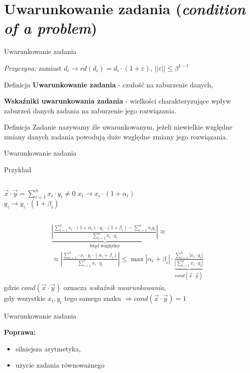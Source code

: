 \section{Uwarunkowanie zadania ({\it condition of a problem})}
\begin{frame}{Uwarunkowanie zadania}

	{\it Przyczyna:} zamiast 
    	$d_i \rightarrow rd(d_i) = d_i \cdot (1 + \varepsilon)$,
        $||\varepsilon|| \le \beta^{1-t}$
        
    \begin{block}{Definicja}
    	{\bf Uwarunkowanie zadania} - czułość na zaburzenie danych,
        
        {\bf Wskaźniki uwarunkowania zadania} - wielkości charakteryzujące wpływ zaburzeń danych zadania na zaburzenie jego rozwiązania.
    \end{block}
    
    \begin{block}{Definicja}
    Zadanie nazywamy źle uwarunkowanym, jeżeli niewielkie względne zmiany danych zadania powodują duże względne zmiany jego rozwiązania.
    \end{block}
\end{frame}
\begin{frame}{Uwarunkowanie zadania}
	\begin{exampleblock}{Przykład}
    \begin{columns}
        	\centering
            $\vec{x} \cdot \vec{y} = \sum_{i=1}^n x_i \cdot y_i \neq 0$
                $x_i \rightarrow x_i \cdot (1 + \alpha_i)$ \\
                $y_i \rightarrow y_i \cdot (1 + \beta_i)$
    \end{columns}
    \begin{gather*}
    	\underbrace{\left| \frac{
        	\sum_{i=1}^n x_i \cdot (1 + \alpha_i) \cdot y_i \cdot (1 + \beta_i) - \sum_{i=1}^n x_i y_i
        }{
        	\sum_{i=1}^n x_i \cdot y_i
        }\right|}_\text{błąd względny}
        \approx \\ \approx
        \left| \frac{
        	\sum_{i=1}^n \cdot x_i \cdot y_i \cdot \left( \alpha_i + \beta_i \right)
        }{
        	\sum_{i=1}^n x_i \cdot y_i
        }\right|
        \le
        \max \left| \alpha_i + \beta_i \right| \cdot \underbrace{\frac{
        	\sum_{i=1}^n \left| x_i \cdot y_i \right|
        }{
        	\left| \sum_{i=1}^n x_i \cdot y_i \right|
        }}_{cond(\vec{x} \cdot \vec{y})}
    \end{gather*}
    gdzie $cond(\vec{x} \cdot \vec{y})$ oznacza {\it wskaźnik uwarunkowania}, \\ 
    gdy wszystkie $x_i, y_i$ tego samego znaku $\Rightarrow cond(\vec{x} \cdot \vec{y}) = 1$
    \end{exampleblock}
\end{frame}
\begin{frame}{Uwarunkowanie zadania}

	{\bf Poprawa:}
    \begin{itemize}
    	\item silniejsza arytmetyka,
        \item użycie zadania równoważnego
    \end{itemize}
\end{frame}
